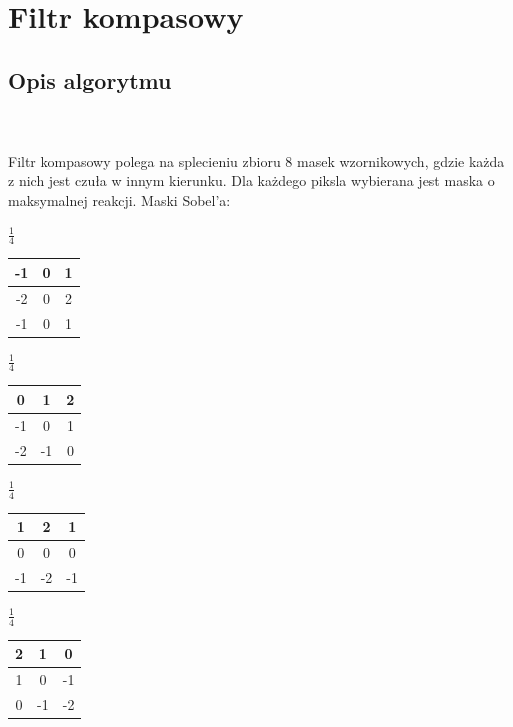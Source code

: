 \documentclass[final,a4paper,openany,12pt]{mwbk}
\begin{document}
\newpage

\section{Filtr kompasowy}
\subsection*{Opis algorytmu}
\hfill
\\\\
\indent Filtr kompasowy polega na splecieniu zbioru 8 masek wzornikowych, gdzie każda z nich jest czuła w innym kierunku. Dla każdego piksla wybierana jest maska o maksymalnej reakcji. Maski Sobel'a:

\begin{center}
	$\frac{1}{4}$
	\begin{tabular}{|c|c|c|}
		\hline
		-1 & 0 & 1\\
		\hline
		-2 & 0 & 2\\
		\hline
		-1 & 0 & 1\\
		\hline
	\end{tabular}
\end{center}

\begin{center}
	$\frac{1}{4}$
	\begin{tabular}{|c|c|c|}
		\hline
		0 & 1 & 2\\
		\hline
		-1 & 0 & 1\\
		\hline
		-2 & -1 & 0\\
		\hline
	\end{tabular}
\end{center}

\begin{center}
	$\frac{1}{4}$
	\begin{tabular}{|c|c|c|}
		\hline
		1 & 2 & 1\\
		\hline
		0 & 0 & 0\\
		\hline
		-1 & -2 & -1\\
		\hline
	\end{tabular}
\end{center}

\begin{center}
	$\frac{1}{4}$
	\begin{tabular}{|c|c|c|}
		\hline
		2 & 1 & 0\\
		\hline
		1 & 0 & -1\\
		\hline
		0 & -1 & -2\\
		\hline
	\end{tabular}
\end{center}
\end{document}
